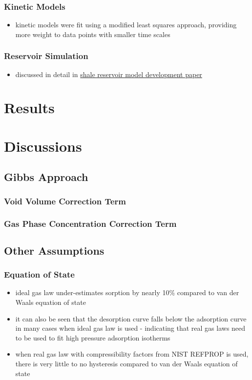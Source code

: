 \documentclass[11pt]{article}
\begin{document}
\subsubsection{Kinetic Models}
\label{sec:orgded8033}
\begin{itemize}
\item kinetic models were fit using a modified least squares approach, providing more weight to data points with smaller time scales
\end{itemize}
\subsubsection{Reservoir Simulation}
\label{sec:org4fbaa18}
\begin{itemize}
\item discussed in detail in \href{reservoirmodeldevelopment.org}{shale reservoir model development paper}
\end{itemize}
\section{Results}
\label{sec:orga5c9089}
\section{Discussions}
\label{sec:org1bca7b3}
\subsection{Gibbs Approach}
\label{sec:org1d4e389}
\subsubsection{Void Volume Correction Term}
\label{sec:org025efaf}
\subsubsection{Gas Phase Concentration Correction Term}
\label{sec:orgb715952}
\subsection{Other Assumptions}
\label{sec:orgae02b7b}
\subsubsection{Equation of State}
\label{sec:org987b3dc}
\begin{itemize}
\item ideal gas law under-estimates sorption by nearly 10\% compared to van der Waals equation of state
\item it can also be seen that the desorption curve falls below the adsorption curve in many cases when ideal gas law is used - indicating that real gas laws need to be used to fit high pressure adsorption isotherms
\item when real gas law with compressibility factors from NIST REFPROP is used, there is very little to no hysteresis compared to van der Waals equation of state
\end{itemize}
\end{document}
